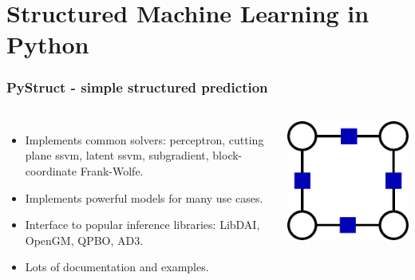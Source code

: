 \documentclass[final,ignorenonframetext,compress]{beamer}
\begin{document}
    \section*{Structured Machine Learning in Python}
    \begin{frame}
        \frametitle{PyStruct - simple structured prediction}
        \begin{columns}
                \begin{itemize}
                    \item Implements common solvers: perceptron, cutting plane
                        ssvm, latent ssvm, subgradient, block-coordinate
                        Frank-Wolfe.
                    \item<2-> Implements powerful models for many use cases.
                    \item<3-> Interface to popular inference libraries: LibDAI, OpenGM, QPBO, AD3.
                    \item<4-> Lots of documentation and examples.
                \end{itemize}
            \begin{center}
                \includegraphics[width=.6\linewidth]{images/logo_pystruct}
            \end{center}
        \end{columns}
    \end{frame}
\end{document}
